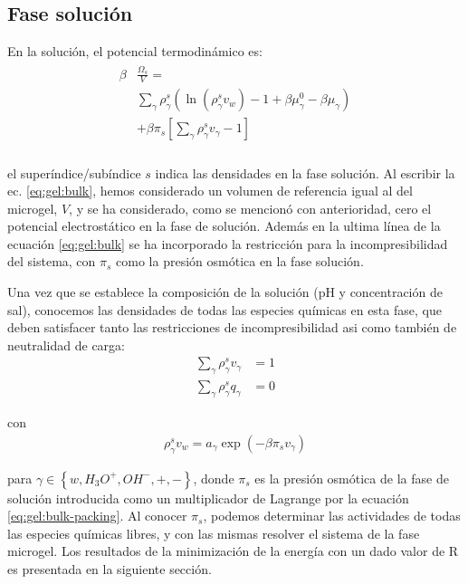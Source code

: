 \subsection{Fase soluci\'on}\label{sec:gel:fase-solucion}

En la soluci\'on, el potencial termodin\'amico es:
%
%
\begin{align}
\begin{aligned}
\beta&\frac{\Omega_s}{V}=\\& \sum_{\gamma   } {\rho^s_\gamma\left(\ln(\rho_\gamma^sv_w) -1 + \beta\mu_\gamma^0 - \beta\mu_\gamma\right)} \\
& +\beta\pi_{s} \left[ \sum_{\gamma } \rho^s_\gamma v_\gamma  -1 \right] \\
\end{aligned}
\label{eq:gel:bulk}
\end{align}

\noindent el super\'indice/sub\'indice  $s$  indica las densidades en la fase soluci\'on.
Al escribir la ec. \ref{eq:gel:bulk}, hemos considerado un volumen de referencia igual al del microgel, $V$, y se ha considerado, como se mencion\'o con anterioridad, cero el potencial electrost\'atico en la fase de soluci\'on.
Adem\'as en la ultima l\'inea de la ecuaci\'on \ref{eq:gel:bulk} se ha incorporado la restricci\'on para la incompresibilidad del sistema, con $\pi_s$ como la presi\'on osm\'otica en la fase soluci\'on.

Una vez que se establece la composici\'on de la soluci\'on (pH y concentraci\'on de sal), conocemos las densidades de todas las especies qu\'imicas en esta fase, que deben satisfacer tanto las restricciones de incompresibilidad asi como tambi\'en  de neutralidad de carga:
%
%
\begin{align}
\sum_{\gamma  } \rho_\gamma^s v_\gamma  &=1\label{eq:gel:bulk-packing}\\
\sum_{\gamma  } \rho_\gamma^s q_\gamma  &=0
\end{align}

\noindent con
%
%
\begin{align}
\rho_\gamma^s v_w= a_\gamma \exp(-\beta\pi_s v_\gamma)
\label{eq:gel:bulk-electroneutrality}
\end{align}



\noindent para $\gamma \in \left\{ w, H_3O^+, OH^-, +,- \right\}$, donde $\pi_s$ es la presi\'on osm\'otica de la fase de soluci\'on introducida como un multiplicador de Lagrange por la ecuaci\'on \ref{eq:gel:bulk-packing}.
Al conocer $\pi_s$, podemos determinar las actividades de todas las especies qu\'imicas libres, y con las mismas resolver el sistema de la fase microgel.
Los resultados de la minimizaci\'on de la energ\'ia con un dado valor de R es presentada en la siguiente secci\'on.

